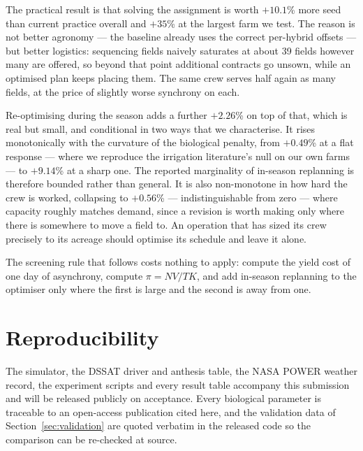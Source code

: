 \documentclass[10pt,twocolumn]{article}
\begin{document}
The practical result is that solving the assignment is worth
$+10.1$\% more seed than current practice overall
and $+35$\% at the largest farm we test. The
reason is not better agronomy --- the baseline already uses the
correct per-hybrid offsets --- but better logistics: sequencing
fields naively saturates at about 39 fields
however many are offered, so beyond that point additional contracts
go unsown, while an optimised plan keeps placing them. The same crew
serves half again as many fields, at the price of slightly worse
synchrony on each.

Re-optimising during the season adds a further
$+2.26$\% on top of that, which is real but small,
and conditional in two ways that we characterise.
It rises monotonically with the curvature of the biological
penalty, from $+0.49$\% at a flat response ---
where we reproduce the irrigation literature's null on our own
farms --- to $+9.14$\% at a sharp one. The
reported marginality of in-season replanning is therefore bounded
rather than general.
It is also non-monotone in how hard the crew is worked,
collapsing to $+0.56$\% --- indistinguishable
from zero --- where capacity roughly matches demand, since a
revision is worth making only where there is somewhere to move a
field to. An operation that has sized its crew precisely to its
acreage should optimise its schedule and leave it alone.

The screening rule that follows costs nothing to apply: compute the
yield cost of one day of asynchrony, compute $\pi = NV/TK$, and add
in-season replanning to the optimiser only where the first is large
and the second is away from one.


\section*{Reproducibility}
The simulator, the DSSAT driver and anthesis table, the NASA POWER weather
record, the experiment scripts and every result table accompany this
submission and will be released publicly on acceptance. Every biological
parameter is traceable to an open-access publication cited here, and the
validation data of Section~\ref{sec:validation} are quoted verbatim in the
released code so the comparison can be re-checked at source.
\end{document}
